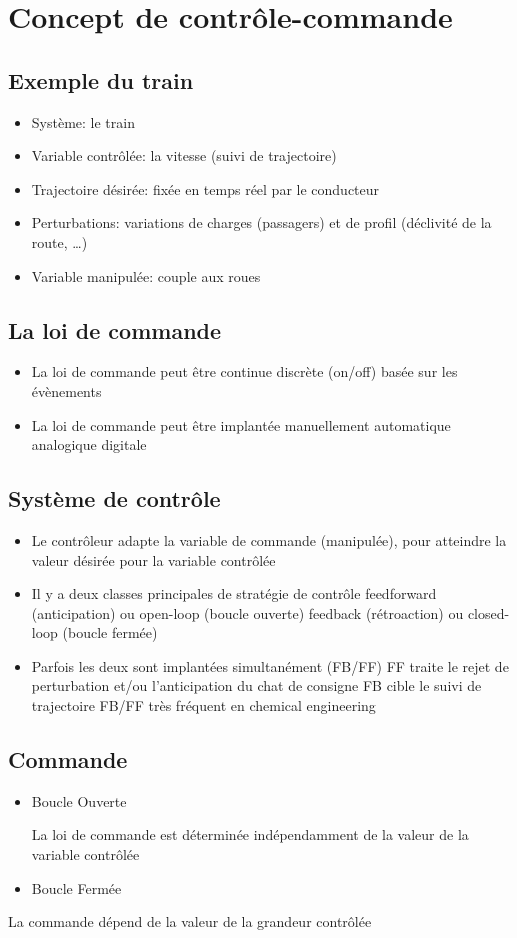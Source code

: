 \documentclass[resume]{subfiles}
\begin{document}
\section{Concept de contrôle-commande}

\subsection{Exemple du train}
\begin{itemize}
\item Système: le train
\item Variable contrôlée: la vitesse (suivi de trajectoire)
\item Trajectoire désirée: fixée en temps réel par le conducteur
\item Perturbations: variations de charges (passagers) et de profil (déclivité de la route, …)
\item Variable manipulée: couple aux roues  
\end{itemize}

\subsection{La loi de commande}
\begin{itemize}
\item La loi de commande peut être
  \subitem continue
  \subitem discrète (on/off)
  \subitem basée sur les évènements
\item La loi de commande peut être implantée
  \subitem manuellement
  \subitem automatique
    \subsubitem analogique
    \subsubitem digitale   
\end{itemize}

\subsection{Système de contrôle}
\begin{itemize}
\item Le contrôleur adapte la variable de commande (manipulée), pour atteindre la valeur désirée pour la variable contrôlée
\item Il y a deux classes principales de stratégie de contrôle
  \subitem feedforward (anticipation) ou open-loop (boucle ouverte)
  \subitem feedback (rétroaction) ou closed-loop (boucle fermée)
\item Parfois les deux sont implantées simultanément (FB/FF)
  \subitem FF traite le rejet de perturbation et/ou l’anticipation du chat de consigne
  \subitem FB cible le suivi de trajectoire
  \subitem FB/FF très fréquent en chemical engineering  
\end{itemize}

\subsection{Commande}
\begin{itemize}
\item Boucle Ouverte

La loi de commande est déterminée indépendamment de
la valeur de la variable contrôlée

\item Boucle Fermée
\end{itemize}

La commande dépend de la valeur de la grandeur
contrôlée
\end{document}
